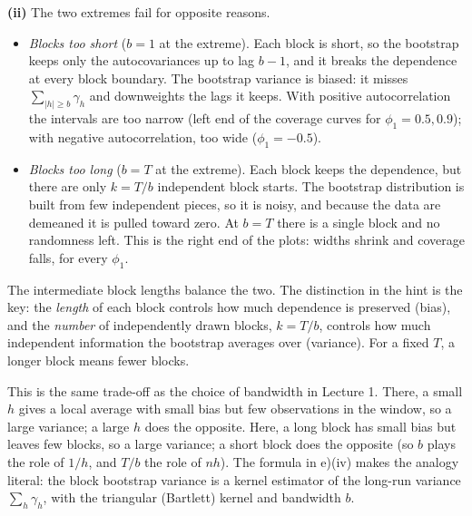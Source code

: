 \documentclass[11pt]{article}
\begin{document}
\textbf{(ii)} The two extremes fail for opposite reasons.
\begin{itemize}
	\item \emph{Blocks too short} ($b=1$ at the extreme). Each block is short, so the bootstrap keeps only the autocovariances up to lag $b-1$, and it breaks the dependence at every block boundary. The bootstrap variance is biased: it misses $\sum_{|h|\ge b}\gamma_h$ and downweights the lags it keeps. With positive autocorrelation the intervals are too narrow (left end of the coverage curves for $\phi_1=0.5,0.9$); with negative autocorrelation, too wide ($\phi_1=-0.5$).
	\item \emph{Blocks too long} ($b=T$ at the extreme). Each block keeps the dependence, but there are only $k=T/b$ independent block starts. The bootstrap distribution is built from few independent pieces, so it is noisy, and because the data are demeaned it is pulled toward zero. At $b=T$ there is a single block and no randomness left. This is the right end of the plots: widths shrink and coverage falls, for every $\phi_1$.
\end{itemize}
The intermediate block lengths balance the two. The distinction in the hint is the key: the \emph{length} of each block controls how much dependence is preserved (bias), and the \emph{number} of independently drawn blocks, $k=T/b$, controls how much independent information the bootstrap averages over (variance). For a fixed $T$, a longer block means fewer blocks.

This is the same trade-off as the choice of bandwidth in Lecture 1. There, a small $h$ gives a local average with small bias but few observations in the window, so a large variance; a large $h$ does the opposite. Here, a long block has small bias but leaves few blocks, so a large variance; a short block does the opposite (so $b$ plays the role of $1/h$, and $T/b$ the role of $nh$). The formula in e)(iv) makes the analogy literal: the block bootstrap variance is a kernel estimator of the long-run variance $\sum_h\gamma_h$, with the triangular (Bartlett) kernel and bandwidth $b$.
\end{document}
